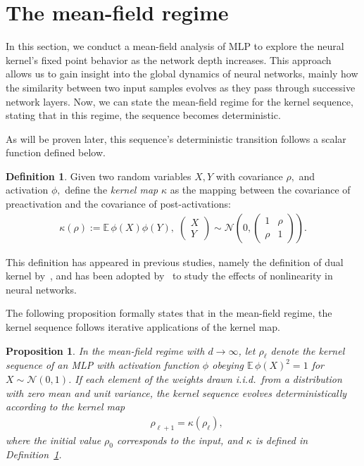\documentclass[twoside]{article}
\newcommand{\E}{\mathbb{E}\,}
\newtheorem{proposition}{Proposition}
\theoremstyle{definition}
\newtheorem{definition}{Definition}
\begin{document}
\section{The mean-field regime}

In this section, we conduct a mean-field analysis of MLP to explore the neural kernel's fixed point behavior as the network depth increases. This approach allows us to gain insight into the global dynamics of neural networks, mainly how the similarity between two input samples evolves as they pass through successive network layers.
Now, we can state the mean-field regime for the kernel sequence, stating that in this regime, the sequence becomes deterministic. 

As will be proven later, this sequence's deterministic transition follows a scalar function defined below. 

\begin{definition}
    \label{def:kernel_map}
Given two random variables $X, Y$ with covariance $\rho,$ and activation $\phi,$ define the \emph{kernel map } $\kappa$ as the mapping between the covariance of preactivation and the covariance of post-activations:
\begin{align}
 \kappa(\rho):=\E\phi(X)\phi(Y), \; 
 \begin{pmatrix}X \\ Y\end{pmatrix}\sim \mathcal N\left(0, \begin{pmatrix} 1 & \rho \\ \rho & 1 \end{pmatrix}
 \right).
 \label{eq:kernel_map}
\end{align}
\end{definition}

This definition has appeared in previous studies, namely the definition of dual kernel by~\citet{daniely2016toward}, and has been adopted by~\citet{joudaki2023impact} to study the effects of nonlinearity in neural networks. 

The following proposition formally states that in the mean-field regime, the kernel sequence follows iterative applications of the kernel map. 

\begin{proposition}
\label{prop:mean_field_kernel_general}
In the mean-field regime with ${d \to \infty}$, let $\rho_\ell$ denote the kernel sequence of an MLP with activation function $\phi$ obeying $\E\phi(X)^2=1$ for $X\sim \mathcal N(0,1)$. If each element of the weights drawn i.i.d.~from a distribution with zero mean and unit variance, the kernel sequence evolves deterministically according to the kernel map
\begin{align*}
&\rho_{\ell+1} = \kappa(\rho_\ell),
\end{align*}
where the initial value $\rho_0$ corresponds to the input, and $\kappa$ is defined in Definition~\ref{def:kernel_map}. 


\end{proposition}
\end{document}
